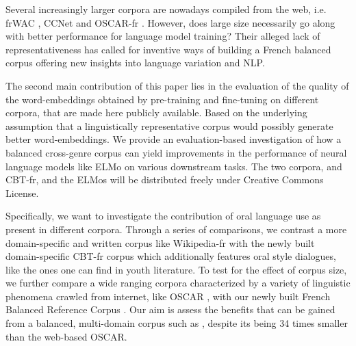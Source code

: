 Several increasingly larger corpora are nowadays compiled from the web, i.e. frWAC \citep{baroni-etal-2009-the}, CCNet \citep{wenzek-etal-2020-ccnet} and OSCAR-fr \citep{ortiz-suarez-etal-2019-asynchronous}. However, does large size necessarily go along with better performance for language model training? Their alleged lack of representativeness has called for inventive ways of building a French balanced corpus offering new insights into language variation and NLP.


The second main contribution of this paper lies in the evaluation of the quality of the word-embeddings obtained by pre-training and fine-tuning on different corpora, that are made here publicly available.
Based on the underlying assumption that a linguistically representative corpus would possibly generate better word-embeddings. %
We provide an evaluation-based investigation of how a balanced cross-genre corpus can yield improvements in the performance of neural language models like ELMo \citep{peters-etal-2018-deep} on various downstream tasks.
The two corpora, \Cabernet and CBT-fr, and the ELMos will be distributed freely under Creative Commons License.

Specifically, we want to investigate the contribution of oral language use as present in different corpora. Through a series of comparisons, we contrast a more domain-specific and written corpus like Wikipedia-fr with the newly built domain-specific CBT-fr corpus which additionally features oral style dialogues, like the ones one can find in youth literature. To test for the effect of corpus size, we further compare a wide ranging corpora characterized by a variety of linguistic phenomena crawled from internet, like OSCAR \citep{ortiz-suarez-etal-2019-asynchronous}, with our newly built French Balanced Reference Corpus \Cabernet.
Our aim is assess the benefits that can be gained from a balanced, multi-domain corpus such as \Cabernet, despite its being 34 times smaller than the web-based OSCAR.


